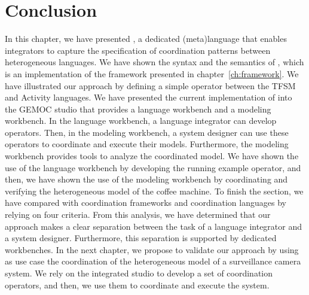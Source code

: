 \section{Conclusion}
In this chapter, we have presented \bcool, a dedicated (meta)language that enables integrators to capture the specification of coordination patterns between heterogeneous languages. We have shown the syntax and the semantics of \bcool, which is an implementation of the framework presented in chapter~\ref{ch:framework}. We have illustrated our approach by defining a simple operator between the TFSM and Activity languages. We have presented the current implementation of \bcool into the GEMOC studio that provides a language workbench and a modeling workbench. In the language workbench, a language integrator can develop \bcool operators. Then, in the modeling workbench, a system designer can use these operators to coordinate and execute their models. Furthermore, the modeling workbench provides tools to analyze the coordinated model. We have shown the use of the language workbench by developing the running example operator, and then, we have shown the use of the modeling workbench by coordinating and verifying the heterogeneous model of the coffee machine. To finish the section, we have compared \bcool with coordination frameworks and coordination languages by relying on four criteria. From this analysis, we have determined that our approach makes a clear separation between the task of a language integrator and a system designer. Furthermore, this separation is supported by dedicated workbenches. In the next chapter, we propose to validate our approach by using as use case the coordination of the heterogeneous model of a surveillance camera system. We rely on the integrated studio to develop a set of coordination operators, and then, we use them to coordinate and execute the system. 


